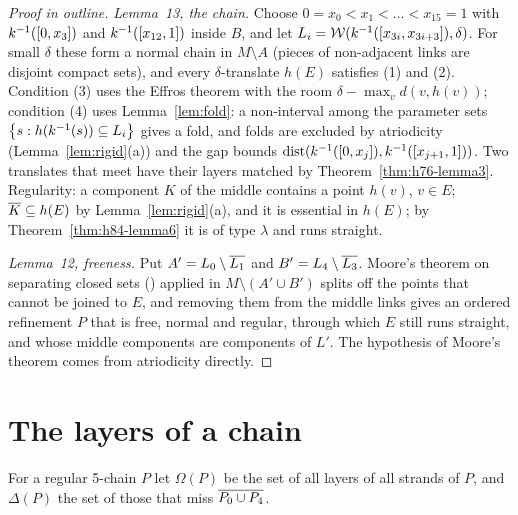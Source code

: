 \begin{proof}[Proof in outline]
\emph{Lemma~13, the chain.} Choose $0=x_0<x_1<\dots<x_{15}=1$ with $k^{-1}([0,x_3])$ and $k^{-1}([x_{12},1])$ inside $B$, and let
$L_i=\mathcal{W}(k^{-1}([x_{3i},x_{3i+3}]),\delta)$. For small $\delta$ these form a normal chain in $M\setminus A$ (pieces of non-adjacent
links are disjoint compact sets), and every $\delta$-translate $h(E)$ satisfies (1) and (2). Condition (3) uses the Effros
theorem with the room $\delta-\max_vd(v,h(v))$; condition (4) uses Lemma~\ref{lem:fold}: a non-interval among the parameter
sets $\left\{ s: h(k^{-1}(s))\subseteq L_i \right\}$ gives a fold, and folds are excluded by atriodicity
(Lemma~\ref{lem:rigid}(a)) and the gap bounds $\operatorname{dist}(k^{-1}([0,x_j]),k^{-1}([x_{j+1},1]))$. Two translates that meet have
their layers matched by Theorem~\ref{thm:h76-lemma3}. Regularity: a component $K$ of the middle contains a point $h(v)$,
$v\in E$; $\overline{K}\subseteq h(E)$ by Lemma~\ref{lem:rigid}(a), and it is essential in $h(E)$; by
Theorem~\ref{thm:h84-lemma6} it is of type $\lambda$ and runs straight.

\emph{Lemma~12, freeness.} Put $A'=L_0\setminus\overline{L_1}$ and $B'=L_4\setminus\overline{L_3}$. Moore's theorem on separating closed sets
() applied in $M\setminus(A'\cup B')$ splits off the points that cannot be joined to $E$, and removing
them from the middle links gives an ordered refinement $P$ that is free, normal and regular, through which $E$ still runs
straight, and whose middle components are components of $L'$. The hypothesis of Moore's theorem comes from atriodicity
directly.
\end{proof}


\section{The layers of a chain}

For a regular 5-chain $P$ let $\Omega(P)$ be the set of all layers of all strands of $P$, and $\Delta(P)$ the set of those
that miss $\overline{P_0\cup P_4}$.


